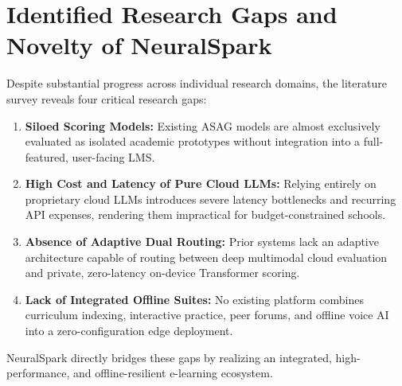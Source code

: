 \section{Identified Research Gaps and Novelty of NeuralSpark}
Despite substantial progress across individual research domains, the literature survey reveals four critical research gaps:
\begin{enumerate}[leftmargin=*]
    \item \textbf{Siloed Scoring Models:} Existing ASAG models are almost exclusively evaluated as isolated academic prototypes without integration into a full-featured, user-facing LMS.
    \item \textbf{High Cost and Latency of Pure Cloud LLMs:} Relying entirely on proprietary cloud LLMs introduces severe latency bottlenecks and recurring API expenses, rendering them impractical for budget-constrained schools.
    \item \textbf{Absence of Adaptive Dual Routing:} Prior systems lack an adaptive architecture capable of routing between deep multimodal cloud evaluation and private, zero-latency on-device Transformer scoring.
    \item \textbf{Lack of Integrated Offline Suites:} No existing platform combines curriculum indexing, interactive practice, peer forums, and offline voice AI into a zero-configuration edge deployment.
\end{enumerate}

NeuralSpark directly bridges these gaps by realizing an integrated, high-performance, and offline-resilient e-learning ecosystem.
